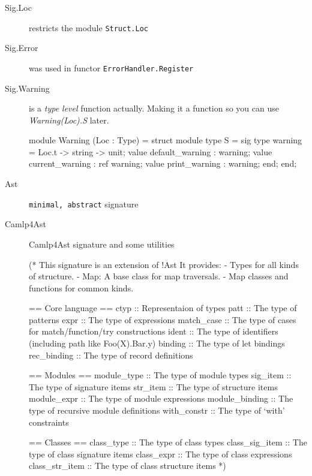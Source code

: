 \begin{description}
\item[Sig.Loc] restricts the module \verb|Struct.Loc|
\item[Sig.Error] was used in functor
  \verb|ErrorHandler.Register|

\item[Sig.Warning]is a \textit{type level}
function actually. Making it a function so you can use
\textit{Warning(Loc).S} later.

  
  \begin{ocamlcode}
module Warning (Loc : Type) = struct
  module type S = sig
    type warning = Loc.t -> string -> unit;
    value default_warning : warning;
    value current_warning : ref warning;
    value print_warning   : warning;
  end;
end;
\end{ocamlcode}

\item[Ast] \verb|minimal, abstract| signature

\item[Camlp4Ast] Camlp4Ast  signature and some utilities

  \begin{ocamlcode}
(*
    This signature is an extension of {!Ast}
    It provides:
      - Types for all kinds of structure.
      - Map: A base class for map traversals.
      - Map classes and functions for common kinds.

    == Core language ==
    ctyp               :: Representaion of types
    patt               :: The type of patterns
    expr               :: The type of expressions
    match_case         :: The type of cases for match/function/try constructions
    ident              :: The type of identifiers (including path like Foo(X).Bar.y)
    binding            :: The type of let bindings
    rec_binding        :: The type of record definitions

    == Modules ==
    module_type        :: The type of module types
    sig_item           :: The type of signature items
    str_item           :: The type of structure items
    module_expr        :: The type of module expressions
    module_binding     :: The type of recursive module definitions
    with_constr        :: The type of `with' constraints

    == Classes ==
    class_type         :: The type of class types
    class_sig_item     :: The type of class signature items
    class_expr         :: The type of class expressions
    class_str_item     :: The type of class structure items
 *)
  \end{ocamlcode}


\end{description}
